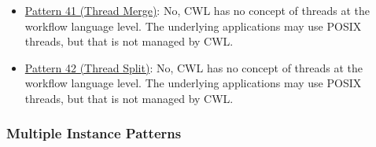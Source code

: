 \begin{itemize}
\item \href{http://www.workflowpatterns.com/patterns/control/new/wcp41.php}{Pattern 41 (Thread Merge)}: No, CWL has no concept of threads at the workflow language level. The underlying applications may use POSIX threads, but that is not managed by CWL.

\item \href{http://www.workflowpatterns.com/patterns/control/new/wcp42.php}{Pattern 42 (Thread Split)}: No, CWL has no concept of threads at the workflow language level. The underlying applications may use POSIX threads, but that is not managed by CWL.
\end{itemize}
\subsubsection{Multiple Instance Patterns}
